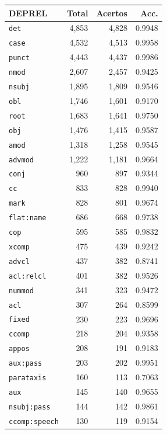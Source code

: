 \begin{table}[ht]
\centering
\footnotesize
\begin{tabular}{lrrr}
\toprule
\textbf{DEPREL} & \textbf{Total} & \textbf{Acertos} & \textbf{Acc.} \\
\midrule
\texttt{det} & 4,853 & 4,828 & 0.9948 \\
\texttt{case} & 4,532 & 4,513 & 0.9958 \\
\texttt{punct} & 4,443 & 4,437 & 0.9986 \\
\texttt{nmod} & 2,607 & 2,457 & 0.9425 \\
\texttt{nsubj} & 1,895 & 1,809 & 0.9546 \\
\texttt{obl} & 1,746 & 1,601 & 0.9170 \\
\texttt{root} & 1,683 & 1,641 & 0.9750 \\
\texttt{obj} & 1,476 & 1,415 & 0.9587 \\
\texttt{amod} & 1,318 & 1,258 & 0.9545 \\
\texttt{advmod} & 1,222 & 1,181 & 0.9664 \\
\texttt{conj} & 960 & 897 & 0.9344 \\
\texttt{cc} & 833 & 828 & 0.9940 \\
\texttt{mark} & 828 & 801 & 0.9674 \\
\texttt{flat\!:\!name} & 686 & 668 & 0.9738 \\
\texttt{cop} & 595 & 585 & 0.9832 \\
\texttt{xcomp} & 475 & 439 & 0.9242 \\
\texttt{advcl} & 437 & 382 & 0.8741 \\
\texttt{acl\!:\!relcl} & 401 & 382 & 0.9526 \\
\texttt{nummod} & 341 & 323 & 0.9472 \\
\texttt{acl} & 307 & 264 & 0.8599 \\
\texttt{fixed} & 230 & 223 & 0.9696 \\
\texttt{ccomp} & 218 & 204 & 0.9358 \\
\texttt{appos} & 208 & 191 & 0.9183 \\
\texttt{aux\!:\!pass} & 203 & 202 & 0.9951 \\
\texttt{parataxis} & 160 & 113 & 0.7063 \\
\texttt{aux} & 145 & 140 & 0.9655 \\
\texttt{nsubj\!:\!pass} & 144 & 142 & 0.9861 \\
\texttt{ccomp\!:\!speech} & 130 & 119 & 0.9154 \\

\end{tabular}
\end{table}
